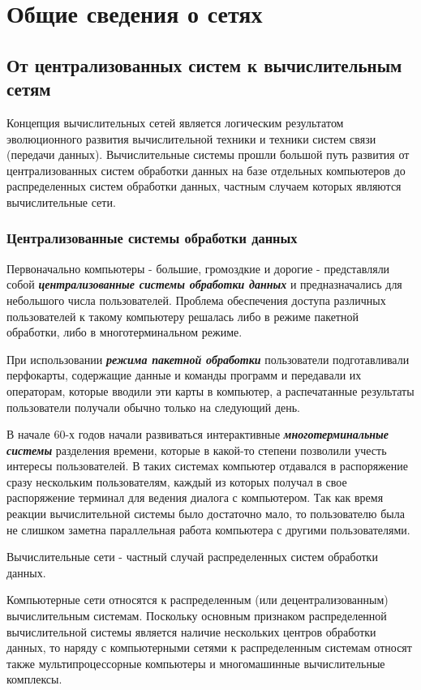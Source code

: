 \chapter{Общие сведения о сетях}

\section{От централизованных систем к вычислительным сетям}

Концепция вычислительных сетей является логическим результатом эволюционного развития вычислительной техники и техники систем связи (передачи  данных).
Вычислительные системы прошли большой путь развития от централизованных систем обработки данных на базе отдельных компьютеров до распределенных систем обработки данных, частным случаем которых являются вычислительные сети.

\subsection{Централизованные системы обработки данных}

Первоначально компьютеры - большие, громоздкие и дорогие - представляли собой \textbf{\textit{централизованные системы обработки данных}} и предназначались для небольшого числа пользователей.
Проблема обеспечения доступа различных пользователей к такому компьютеру решалась либо в режиме пакетной обработки, либо в многотерминальном режиме.

При использовании \textbf{\textit{режима пакетной обработки}} пользователи подготавливали перфокарты, содержащие данные и команды программ и передавали их операторам, которые вводили эти карты в компьютер, а распечатанные результаты пользователи получали обычно только на следующий день.

В начале 60-х годов начали развиваться интерактивные \textbf{\textit{многотерминальные системы}} разделения времени, которые в какой-то степени позволили учесть интересы пользователей.
В таких системах компьютер отдавался в распоряжение сразу нескольким пользователям, каждый из которых получал в свое распоряжение терминал для ведения диалога с компьютером.
Так как время реакции вычислительной системы было достаточно мало, то пользователю была не слишком заметна параллельная работа компьютера с другими пользователями.

Вычислительные сети - частный случай распределенных систем обработки данных.

Компьютерные сети относятся к распределенным (или децентрализованным) вычислительным системам. Поскольку основным признаком распределенной вычислительной системы является наличие нескольких центров обработки данных, то наряду с компьютерными сетями к распределенным системам относят также мультипроцессорные компьютеры и многомашинные вычислительные комплексы.

